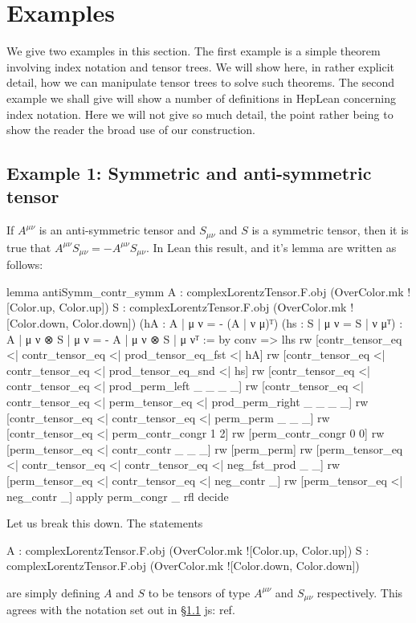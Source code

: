 \documentclass[a4paper, 11pt]{article}
\newcommand{\js}[1]{ {\color{magenta} js:  #1}}
\begin{document}
\section{Examples}

We give two examples in this section. The first example is a simple theorem involving index notation and 
tensor trees. We will show here, in rather explicit detail, how we can manipulate tensor trees to solve 
such theorems. 
The second example we shall give will show a number of definitions in HepLean concerning index notation.
Here we will not give so much detail, the point rather being to show the reader the broad use of our 
construction. 

\subsection{Example 1: Symmetric and anti-symmetric tensor}
If $A^{\mu \nu}$ is an anti-symmetric tensor and $S_{\mu \nu}$ and $S$ is a symmetric tensor, then
it is true that $A^{\mu \nu} S_{\mu \nu} = - A^{\mu \nu} S_{\mu \nu}$. In Lean this result, and 
it's lemma are written as follows: 
\begin{code}
lemma antiSymm_contr_symm 
    {A : complexLorentzTensor.F.obj (OverColor.mk ![Color.up, Color.up])}
    {S : complexLorentzTensor.F.obj (OverColor.mk ![Color.down, Color.down])}
    (hA : {A | μ ν = - (A | ν μ)}ᵀ) (hs : {S | μ ν = S | ν μ}ᵀ) :
    {A | μ ν ⊗ S | μ ν = - A | μ ν ⊗ S | μ ν}ᵀ := by
  conv =>
    lhs
    rw [contr_tensor_eq <| contr_tensor_eq <| prod_tensor_eq_fst <| hA]
    rw [contr_tensor_eq <| contr_tensor_eq <| prod_tensor_eq_snd <| hs]
    rw [contr_tensor_eq <| contr_tensor_eq <| prod_perm_left _ _ _ _]
    rw [contr_tensor_eq <| contr_tensor_eq <| perm_tensor_eq <| prod_perm_right _ _ _ _]
    rw [contr_tensor_eq <| contr_tensor_eq <| perm_perm _ _ _]
    rw [contr_tensor_eq <| perm_contr_congr 1 2]
    rw [perm_contr_congr 0 0]
    rw [perm_tensor_eq <| contr_contr _ _ _]
    rw [perm_perm]
    rw [perm_tensor_eq <| contr_tensor_eq <| contr_tensor_eq <| neg_fst_prod _ _]
    rw [perm_tensor_eq <| contr_tensor_eq <| neg_contr _]
    rw [perm_tensor_eq <| neg_contr _]
  apply perm_congr _ rfl
  decide
\end{code}
Let us break this down. The statements 
\begin{code} 
{A : complexLorentzTensor.F.obj (OverColor.mk ![Color.up, Color.up])}
{S : complexLorentzTensor.F.obj (OverColor.mk ![Color.down, Color.down])}
\end{code}
are simply defining $A$ and $S$ to be tensors of type $A^{\mu \nu}$ and $S_{\mu \nu}$ respectively.
This agrees with the notation set out in \S\ref{} \js{ref}.
\end{document}
